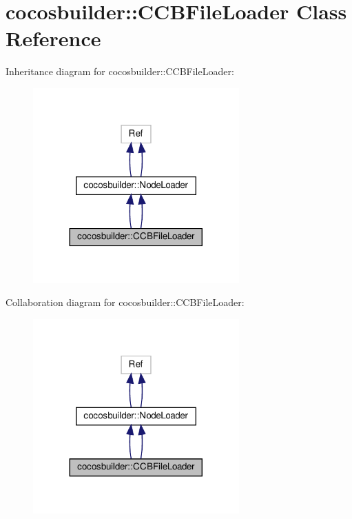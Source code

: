 \hypertarget{classcocosbuilder_1_1CCBFileLoader}{}\section{cocosbuilder\+:\+:C\+C\+B\+File\+Loader Class Reference}
\label{classcocosbuilder_1_1CCBFileLoader}


Inheritance diagram for cocosbuilder\+:\+:C\+C\+B\+File\+Loader\+:
\nopagebreak
\begin{figure}[H]
\begin{center}
\leavevmode
\includegraphics[width=224pt]{classcocosbuilder_1_1CCBFileLoader__inherit__graph}
\end{center}
\end{figure}


Collaboration diagram for cocosbuilder\+:\+:C\+C\+B\+File\+Loader\+:
\nopagebreak
\begin{figure}[H]
\begin{center}
\leavevmode
\includegraphics[width=224pt]{classcocosbuilder_1_1CCBFileLoader__coll__graph}
\end{center}
\end{figure}
